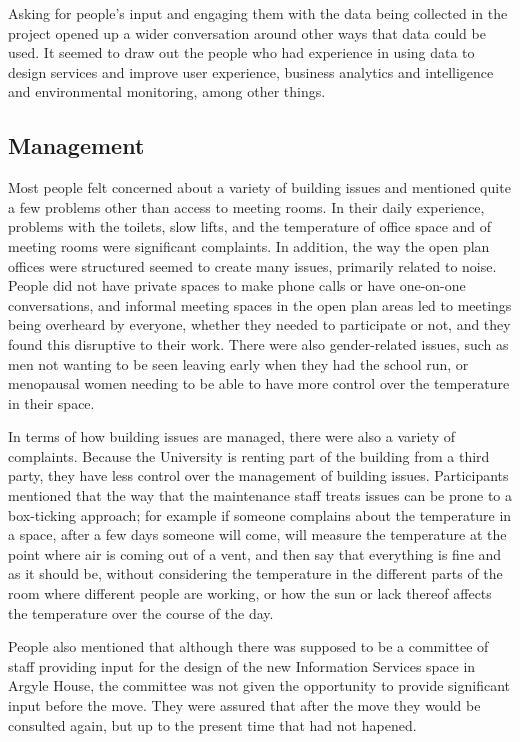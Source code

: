 Asking for people’s input and engaging them with the data being
collected in the project opened up a wider conversation around other
ways that data could be used. It seemed to draw out the people who had
experience in using data to design services and improve user
experience, business analytics and intelligence and environmental
monitoring, among other things. 


\subsection{Management}
\label{sec:management}

Most people felt concerned about a variety of building issues and
mentioned quite a few problems other than access to meeting rooms. In
their daily experience, problems with the toilets, slow lifts, and the
temperature of office space and of meeting rooms were significant
complaints. In addition, the way the open plan offices were structured
seemed to create many issues, primarily related to noise. People did
not have private spaces to make phone calls or have one-on-one
conversations, and informal meeting spaces in the open plan areas led
to meetings being overheard by everyone, whether they needed to
participate or not, and they found this disruptive to their
work. There were also gender-related issues, such as men not wanting
to be seen leaving early when they had the school run, or menopausal
women needing to be able to have more control over the temperature in
their space.  

In terms of how building issues are managed, there were also a variety
of complaints. Because the University is renting part of the building
from a third party, they have less control over the management of
building issues. Participants mentioned that the way that the
maintenance staff treats issues can be prone to a box-ticking
approach; for example if someone complains about the temperature in a
space, after a few days someone will come, will measure the
temperature at the point where air is coming out of a vent, and then
say that everything is fine and as it should be, without considering
the temperature in the different parts of the room where different
people are working, or how the sun or lack thereof affects the
temperature over the course of the day.

People also mentioned that although there was supposed to be a
committee of staff providing input for the design of the new
Information Services space in Argyle House, the committee was not
given the opportunity to provide significant input before the
move. They were assured that after the move they would be consulted
again, but up to the present time that had not hapened.

